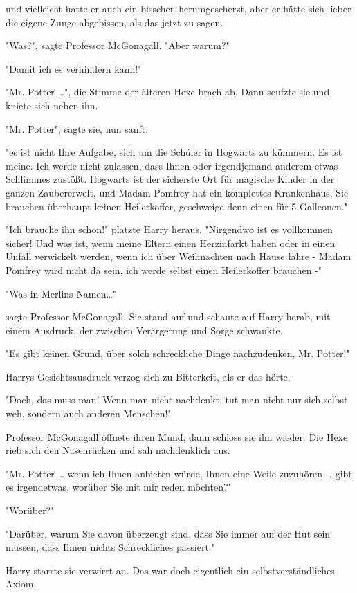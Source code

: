 {und vielleicht hatte er auch ein bisschen herumgescherzt, aber er hätte sich lieber die eigene Zunge abgebissen, als das jetzt zu sagen.

"Was?", sagte Professor McGonagall. "Aber warum?"

"Damit ich es verhindern kann!"

"Mr. Potter …", die Stimme der älteren Hexe brach ab. Dann seufzte sie und kniete sich neben ihn.

"Mr. Potter", sagte sie, nun sanft,

"es ist nicht Ihre Aufgabe, sich um die Schüler in Hogwarts zu kümmern. Es ist meine. Ich werde nicht zulassen, dass Ihnen oder irgendjemand anderem etwas Schlimmes zustößt. Hogwarts ist der sicherste Ort für magische Kinder in der ganzen Zaubererwelt, und Madam Pomfrey hat ein komplettes Krankenhaus. Sie brauchen überhaupt keinen Heilerkoffer, geschweige denn einen für 5 Galleonen."

"Ich brauche ihn schon!" platzte Harry heraus. "Nirgendwo ist es vollkommen sicher! Und was ist, wenn meine Eltern einen Herzinfarkt haben oder in einen Unfall verwickelt werden, wenn ich über Weihnachten nach Hause fahre - Madam Pomfrey wird nicht da sein, ich werde selbst einen Heilerkoffer brauchen -"

"Was in Merlins Namen…"

sagte Professor McGonagall. Sie stand auf und schaute auf Harry herab, mit einem Ausdruck, der zwischen Verärgerung und Sorge schwankte.

"Es gibt keinen Grund, über solch schreckliche Dinge nachzudenken, Mr. Potter!"

Harrys Gesichtsausdruck verzog sich zu Bitterkeit, als er das hörte.

"Doch, das muss man! Wenn man nicht nachdenkt, tut man nicht nur sich selbst weh, sondern auch anderen Menschen!"

Professor McGonagall öffnete ihren Mund, dann schloss sie ihn wieder. Die Hexe rieb sich den Nasenrücken und sah nachdenklich aus.

"Mr. Potter … wenn ich Ihnen anbieten würde, Ihnen eine Weile zuzuhören … gibt es irgendetwas, worüber Sie mit mir reden möchten?"

"Worüber?"

"Darüber, warum Sie davon überzeugt sind, dass Sie immer auf der Hut sein müssen, dass Ihnen nichts Schreckliches passiert."

Harry starrte sie verwirrt an. Das war doch eigentlich ein selbstverständliches Axiom.

}

